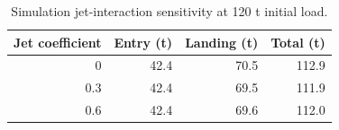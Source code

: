 \begin{table}[htbp]
\caption{Simulation jet-interaction sensitivity at 120 t initial load.}
\label{tab:src12}
\small
\setlength{\tabcolsep}{3.5pt}
\begin{tabularx}{\linewidth}{@{}rrrr@{}}
\toprule
Jet coefficient & Entry (t) & Landing (t) & Total (t) \\
\midrule
0 & 42.4 & 70.5 & 112.9 \\
0.3 & 42.4 & 69.5 & 111.9 \\
0.6 & 42.4 & 69.6 & 112.0 \\
\bottomrule
\end{tabularx}
\par{}
\end{table}
